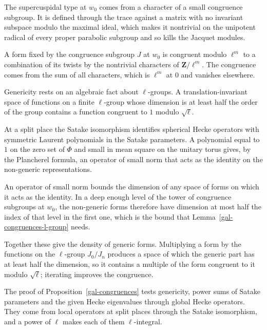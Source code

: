 The supercuspidal type at $w_0$ comes from a character of a small congruence subgroup. It is defined
through the trace against a matrix with no invariant subspace modulo the maximal ideal, which makes it
nontrivial on the unipotent radical of every proper parabolic subgroup and so kills the Jacquet modules.

A form fixed by the congruence subgroup $J$ at $w_0$ is congruent modulo $\ell^m$ to a combination of its
twists by the nontrivial characters of $\mathbf Z/\ell^m$. The congruence comes from the sum of all
characters, which is $\ell^m$ at $0$ and vanishes elsewhere.

Genericity rests on an algebraic fact about $\ell$-groups. A translation-invariant space of functions on a
finite $\ell$-group whose dimension is at least half the order of the group contains a function congruent
to $1$ modulo $\sqrt\ell$.

At a split place the Satake isomorphism identifies spherical Hecke operators with symmetric Laurent
polynomials in the Satake parameters. A polynomial equal to $1$ on the zero set of $\Phi$ and small in mean
square on the unitary torus gives, by the Plancherel formula, an operator of small norm that acts as the
identity on the non-generic representations.

An operator of small norm bounds the dimension of any space of forms on which it acts as the identity. In a
deep enough level of the tower of congruence subgroups at $w_0$, the non-generic forms therefore have
dimension at most half the index of that level in the first one, which is the bound that
Lemma~\ref{gal-congruences-l-group} needs.

Together these give the density of generic forms. Multiplying a form by the functions on the $\ell$-group
$J_0/J_n$ produces a space of which the generic part has at least half the dimension, so it contains a
multiple of the form congruent to it modulo $\sqrt\ell$; iterating improves the congruence.

The proof of Proposition~\ref{gal-congruences} tests genericity, power sums of Satake parameters and the
given Hecke eigenvalues through global Hecke operators. They come from local operators at split places
through the Satake isomorphism, and a power of $\ell$ makes each of them $\ell$-integral.

